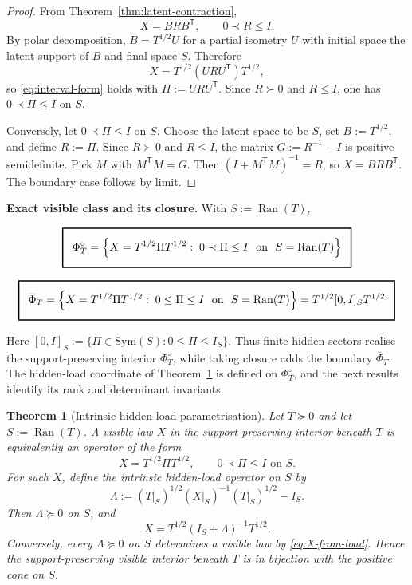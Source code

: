 \documentclass[11pt]{article}
\numberwithin{equation}{section}
\newcommand{\Sym}{\mathrm{Sym}}
\theoremstyle{thmcompact}
\newtheorem{theorem}{Theorem}[section]
\theoremstyle{remark}
\begin{document}
\begin{proof}
From Theorem~\ref{thm:latent-contraction},
\[
X = BRB^{\mathsf T},
\qquad 0\prec R\le I.
\]
By polar decomposition, $B=T^{1/2}U$ for a partial isometry $U$ with initial space the latent support of $B$ and final space $S$. Therefore
\[
X=T^{1/2}(URU^{\mathsf T})T^{1/2},
\]
so \eqref{eq:interval-form} holds with $\Pi:=URU^{\mathsf T}$. Since $R\succ 0$ and $R\le I$, one has $0\prec\Pi\le I$ on $S$.

Conversely, let $0\prec\Pi\le I$ on $S$. Choose the latent space to be $S$, set $B:=T^{1/2}$, and define $R:=\Pi$. Since $R\succ 0$ and $R\le I$, the matrix $G:=R^{-1}-I$ is positive semidefinite. Pick $M$ with $M^{\mathsf T}M=G$. Then $(I+M^{\mathsf T}M)^{-1}=R$, so $X=BRB^{\mathsf T}$. The boundary case follows by limit.
\end{proof}

\noindent\textbf{Exact visible class and its closure.} With $S:=\operatorname{Ran}(T)$,

\[
\begingroup
\setlength{\fboxsep}{8pt}%
\setlength{\fboxrule}{1.05pt}%
\boxed{\displaystyle \Phi_T^{\circ}=\left\{X=T^{1/2}\Pi T^{1/2}:\; 0\prec \Pi\le I\ \text{ on }\ S=\operatorname{Ran}(T)\right\}}%
\endgroup
\]

\[
\begingroup
\setlength{\fboxsep}{8pt}%
\setlength{\fboxrule}{1.05pt}%
\boxed{\displaystyle \overline{\Phi}_T=\left\{X=T^{1/2}\Pi T^{1/2}:\; 0\le \Pi\le I\ \text{ on }\ S=\operatorname{Ran}(T)\right\}=T^{1/2}[0,I]_S T^{1/2}}%
\endgroup
\]

Here $[0,I]_S:=\{\Pi\in\Sym(S):0\le \Pi\le I_S\}$. Thus finite hidden sectors realise the support-preserving interior $\Phi_T^{\circ}$, while taking closure adds the boundary $\overline{\Phi}_T$. The hidden-load coordinate of Theorem~\ref{thm:hidden-load} is defined on $\Phi_T^{\circ}$, and the next results identify its rank and determinant invariants.

\begin{theorem}[Intrinsic hidden-load parametrisation]\label{thm:hidden-load}
Let $T\succeq 0$ and let $S:=\operatorname{Ran}(T)$. A visible law $X$ in the support-preserving interior beneath $T$ is equivalently an operator of the form
\[
X=T^{1/2}\Pi T^{1/2},
\qquad
0\prec \Pi\le I \text{ on } S.
\]
For such $X$, define the intrinsic hidden-load operator on $S$ by
\begin{equation}\label{eq:hidden-load}
\Lambda
:=
(T|_S)^{1/2}(X|_S)^{-1}(T|_S)^{1/2}-I_S.
\end{equation}
Then $\Lambda\succeq 0$ on $S$, and
\begin{equation}\label{eq:X-from-load}
X=T^{1/2}(I_S+\Lambda)^{-1}T^{1/2}.
\end{equation}
Conversely, every $\Lambda\succeq 0$ on $S$ determines a visible law by \eqref{eq:X-from-load}. Hence the support-preserving visible interior beneath $T$ is in bijection with the positive cone on $S$.
\end{theorem}
\end{document}
